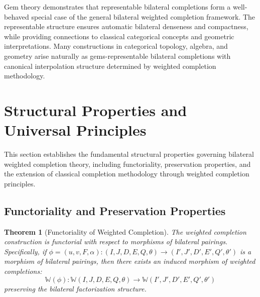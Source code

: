 \documentclass[11pt]{article}
\theoremstyle{plain}
\newtheorem{theorem}{Theorem}[section]
\theoremstyle{definition}
\theoremstyle{remark}
\begin{document}
Gem theory demonstrates that representable bilateral completions form a well-behaved special case of the general bilateral weighted completion framework. The representable structure ensures automatic bilateral denseness and compactness, while providing connections to classical categorical concepts and geometric interpretations. Many constructions in categorical topology, algebra, and geometry arise naturally as gems-representable bilateral completions with canonical interpolation structure determined by weighted completion methodology.

\section{Structural Properties and Universal Principles}

This section establishes the fundamental structural properties governing bilateral weighted completion theory, including functoriality, preservation properties, and the extension of classical completion methodology through weighted completion principles.

\subsection{Functoriality and Preservation Properties}

\begin{theorem}[Functoriality of Weighted Completion]\label{thm:completion-functorial}
The weighted completion construction is functorial with respect to morphisms of bilateral pairings. Specifically, if $\phi = (u, v, F, \alpha) : (I, J, D, E, Q, \theta) \to (I', J', D', E', Q', \theta')$ is a morphism of bilateral pairings, then there exists an induced morphism of weighted completions:
$$\mathbb{W}(\phi) : \mathbb{W}(I, J, D, E, Q, \theta) \to \mathbb{W}(I', J', D', E', Q', \theta')$$
preserving the bilateral factorization structure.
\end{theorem}
\end{document}
